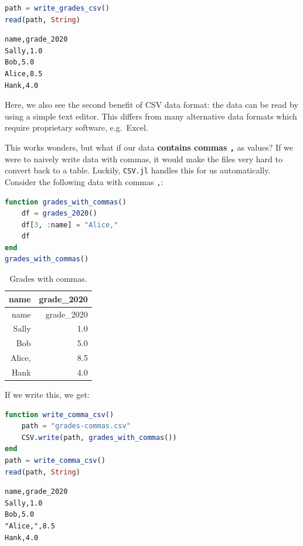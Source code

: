 \documentclass[
  notoc %
]{tufte-book}
\newcommand{\passthrough}[1]{#1}
\begin{document}
\begin{lstlisting}[language=Julia]
path = write_grades_csv()
read(path, String)
\end{lstlisting}

\begin{lstlisting}[language=Output]
name,grade_2020
Sally,1.0
Bob,5.0
Alice,8.5
Hank,4.0

\end{lstlisting}

Here, we also see the second benefit of CSV data format: the data can be
read by using a simple text editor. This differs from many alternative
data formats which require proprietary software, e.g.~Excel.

This works wonders, but what if our data \textbf{contains commas
\passthrough{\lstinline!,!}} as values? If we were to naively write data
with commas, it would make the files very hard to convert back to a
table. Luckily, \passthrough{\lstinline!CSV.jl!} handles this for us
automatically. Consider the following data with commas
\passthrough{\lstinline!,!}:

\begin{lstlisting}[language=Julia]
function grades_with_commas()
    df = grades_2020()
    df[3, :name] = "Alice,"
    df
end
grades_with_commas()
\end{lstlisting}

\hypertarget{tbl:grades_with_commas}{}
\begin{longtable}[]{@{}rr@{}}
\caption{\label{tbl:grades_with_commas}Grades with
commas.}\tabularnewline
\toprule
name & grade\_2020 \\
\midrule
\endfirsthead
\toprule
name & grade\_2020 \\
\midrule
\endhead
Sally & 1.0 \\
Bob & 5.0 \\
Alice, & 8.5 \\
Hank & 4.0 \\
\bottomrule
\end{longtable}

If we write this, we get:

\begin{lstlisting}[language=Julia]
function write_comma_csv()
    path = "grades-commas.csv"
    CSV.write(path, grades_with_commas())
end
path = write_comma_csv()
read(path, String)
\end{lstlisting}

\begin{lstlisting}[language=Output]
name,grade_2020
Sally,1.0
Bob,5.0
"Alice,",8.5
Hank,4.0

\end{lstlisting}
\end{document}
